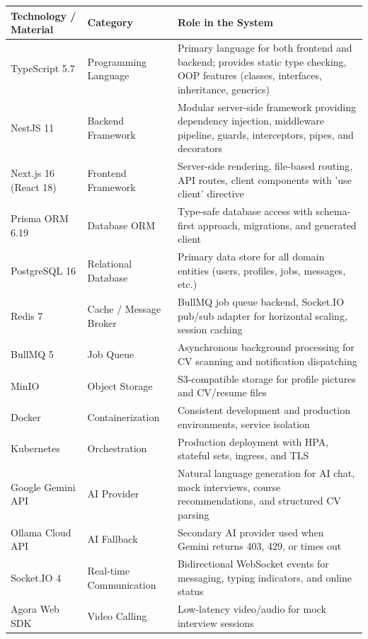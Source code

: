 \documentclass[12pt,a4paper]{report}
\begin{document}
\begin{longtable}{|p{3.5cm}|p{3.5cm}|p{5.5cm}|}
\hline
\textbf{Technology / Material} & \textbf{Category} & \textbf{Role in the System} \\
\hline
TypeScript 5.7 & Programming Language & Primary language for both frontend and backend; provides static type checking, OOP features (classes, interfaces, inheritance, generics) \\
\hline
NestJS 11 & Backend Framework & Modular server-side framework providing dependency injection, middleware pipeline, guards, interceptors, pipes, and decorators \\
\hline
Next.js 16 (React 18) & Frontend Framework & Server-side rendering, file-based routing, API routes, client components with 'use client' directive \\
\hline
Prisma ORM 6.19 & Database ORM & Type-safe database access with schema-first approach, migrations, and generated client \\
\hline
PostgreSQL 16 & Relational Database & Primary data store for all domain entities (users, profiles, jobs, messages, etc.) \\
\hline
Redis 7 & Cache / Message Broker & BullMQ job queue backend, Socket.IO pub/sub adapter for horizontal scaling, session caching \\
\hline
BullMQ 5 & Job Queue & Asynchronous background processing for CV scanning and notification dispatching \\
\hline
MinIO & Object Storage & S3-compatible storage for profile pictures and CV/resume files \\
\hline
Docker & Containerization & Consistent development and production environments, service isolation \\
\hline
Kubernetes & Orchestration & Production deployment with HPA, stateful sets, ingress, and TLS \\
\hline
Google Gemini API & AI Provider & Natural language generation for AI chat, mock interviews, course recommendations, and structured CV parsing \\
\hline
Ollama Cloud API & AI Fallback & Secondary AI provider used when Gemini returns 403, 429, or times out \\
\hline
Socket.IO 4 & Real-time Communication & Bidirectional WebSocket events for messaging, typing indicators, and online status \\
\hline
Agora Web SDK & Video Calling & Low-latency video/audio for mock interview sessions \\

\end{longtable}
\end{document}
